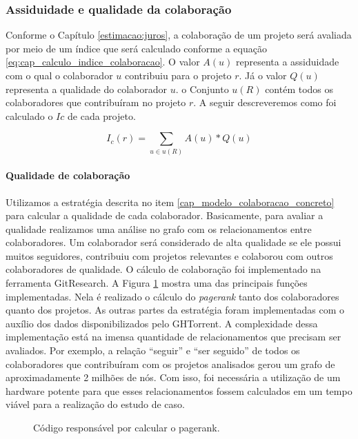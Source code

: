 \subsubsection{Assiduidade e qualidade da colaboração}

 Conforme o Capítulo \ref{estimacao:juros}, a colaboração de um projeto será avaliada por meio de um índice que será calculado conforme a equação \ref{eq:cap_calculo_indice_colaboracao}. O valor $A(u)$ representa a assiduidade com o qual o colaborador $u$ contribuiu para o projeto $r$. Já o valor $Q(u)$ representa a qualidade do colaborador $u$. o Conjunto $u(R)$ contém todos os colaboradores que contribuíram no projeto $r$. A seguir descreveremos como foi calculado o $Ic$ de cada projeto.

\begin{equation}
\label{eq:cap_calculo_indice_colaboracao}
I_c(r) =  \sum_{u  \in u(R) } A(u) * Q(u)
\end{equation}

\paragraph{Qualidade de colaboração}


Utilizamos a estratégia descrita no item \ref{cap_modelo_colaboracao_concreto} para calcular a qualidade de cada colaborador. Basicamente, para avaliar a qualidade realizamos uma análise no grafo com os relacionamentos entre colaboradores. Um colaborador será considerado de alta qualidade se ele possui muitos seguidores, contribuiu com projetos relevantes e colaborou com outros colaboradores de qualidade.  O cálculo de colaboração foi implementado na ferramenta GitResearch.  A Figura \ref{fig:codigo_calcula_pagerank} mostra uma das principais funções implementadas.  Nela é realizado o cálculo do \textit{pagerank} tanto dos colaboradores quanto dos projetos. As outras partes da estratégia foram implementadas com o auxílio dos dados disponibilizados pelo GHTorrent. A complexidade dessa implementação está na imensa quantidade de relacionamentos que precisam ser avaliados. Por exemplo, a relação ``seguir'' e ``ser seguido'' de todos os colaboradores que contribuíram com os projetos analisados gerou um grafo de aproximadamente 2 milhões de nós. Com isso, foi necessária a utilização de um hardware potente para que esses relacionamentos fossem calculados em um tempo viável para a realização do estudo de caso. 

 \begin{figure}[H]
  \centering
  \caption{Código responsável por calcular o pagerank.}
  \label{fig:codigo_calcula_pagerank} 
\end{figure}


